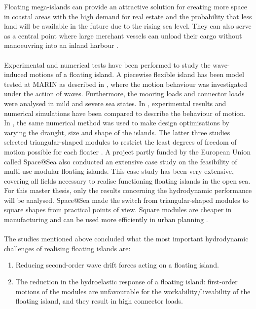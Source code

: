

Floating mega-islands can provide an attractive solution for creating more space in coastal areas with the high demand for real estate and the probability that less land will be available in the future due to the rising sea level. They can also serve as a central point where large merchant vessels can unload their cargo without manoeuvring into an inland harbour \parencite{businessCase_S@S_D1.1}.\\
\\
Experimental and numerical tests have been performed to study the wave-induced motions of a floating island. A piecewise flexible island has been model tested at MARIN as described in \citet{Waals2018}, where the motion behaviour was investigated under the action of waves. Furthermore, the mooring loads and connector loads were analysed in mild and severe sea states. In \parencite{Otto2019}, experimental results and numerical simulations have been compared to describe the behaviour of motion. In \parencite{Isope2019}, the same numerical method was used to make design optimisations by varying the draught, size and shape of the islands. The latter three studies selected triangular-shaped modules to restrict the least degrees of freedom of motion possible for each floater \parencite{Waals2018}. A project partly funded by the European Union called Space@Sea also conducted an extensive case study on the feasibility of multi-use modular floating islands. This case study has been very extensive, covering all fields necessary to realise functioning floating islands in the open sea. For this master thesis, only the results concerning the hydrodynamic performance will be analysed. Space@Sea made the switch from triangular-shaped modules to square shapes from practical points of view. Square modules are cheaper in manufacturing and can be used more efficiently in urban planning \parencite{S@SInventoryRegulations}.  \\
\\



The studies mentioned above concluded what the most important hydrodynamic challenges of realising floating islands are:
\begin{enumerate}
    \item Reducing second-order wave drift forces acting on a floating island.
    \item The reduction in the hydroelastic response of a floating island: first-order motions of the modules are unfavourable for the workability/liveability of the floating island, and they result in high connector loads. 
\end{enumerate}


